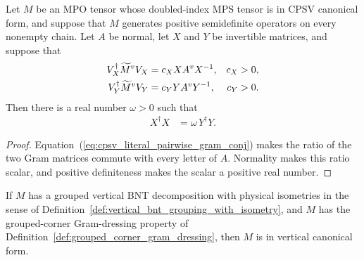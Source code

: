 \begin{lemma}
    \label{thm:cpsv_literal_positive_relative_gram_scalar}
    \leanok
    Let $M$ be an MPO tensor whose doubled-index MPS tensor is in
    CPSV canonical form, and suppose that $M$ generates positive semidefinite
    operators on every nonempty chain. Let $A$ be normal, let $X$ and $Y$ be
    invertible matrices, and suppose that
    \begin{align}
        V_X^\dagger\widetilde M^vV_X
            & =c_X X A^vX^{-1},
            &
        c_X & >0,
        \notag                  \\
        V_Y^\dagger\widetilde M^vV_Y
            & =c_Y Y A^vY^{-1},
            &
        c_Y & >0.
        \notag
    \end{align}
    Then there is a real number $\omega>0$ such that
    \begin{align}
        X^\dagger X & =\omega\,Y^\dagger Y.
        \label{eq:cpsv_literal_positive_relative_gram}
    \end{align}
\end{lemma}

\begin{proof}\leanok
    Equation~(\ref{eq:cpsv_literal_pairwise_gram_conj}) makes the ratio of the
    two Gram matrices commute with every letter of $A$. Normality makes this
    ratio scalar, and positive definiteness makes the scalar a positive real
    number.
\end{proof}

\begin{lemma}
    \label{thm:vertical_cf_of_grouping_and_gram_dressing}
    \leanok
    If $M$ has a grouped vertical BNT decomposition with physical isometries
    in the sense of
    Definition~\ref{def:vertical_bnt_grouping_with_isometry}, and $M$ has the
    grouped-corner Gram-dressing property of
    Definition~\ref{def:grouped_corner_gram_dressing}, then $M$ is in vertical
    canonical form.
\end{lemma}

